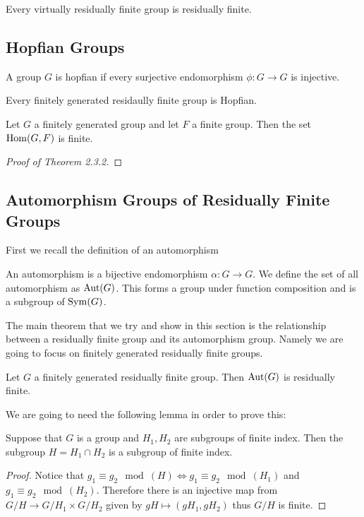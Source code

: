 \begin{propn}
  Every virtually residually finite group is residually finite.
\end{propn}

\subsection{Hopfian Groups}

\begin{defn}
  A group $G$ is hopfian if every surjective endomorphism $\phi: G\to G$  is
  injective.
\end{defn}

\begin{thm}
  Every finitely generated residaully finite group is Hopfian.
\end{thm}
\begin{lemma}
 Let $G$ a finitely generated group and let $F$ a finite group. Then the set
 $\operatorname{Hom}(G, F)$ is finite. 
\end{lemma}

\begin{proof}[Proof of Theorem 2.3.2]
  
\end{proof}

\subsection{Automorphism Groups of Residually Finite Groups}

First we recall the definition of an automorphism
\begin{defn}
  An automorphism is a bijective endomorphism $\alpha: G \to G$. We define the
  set of all automorphism as $\operatorname{Aut}(G)$. This forms a group under function
  composition and is a subgroup of $\operatorname{Sym}(G)$.
\end{defn}

The main theorem that we try and show in this section is the relationship
between a residually finite group and its automorphism group. Namely we are
going to focus on finitely generated residually finite groups.

\begin{thm}
  Let $G$ a finitely generated residually finite group. Then $\operatorname{Aut}(G)$ is
  residually finite.
\end{thm}

We are going to need the following lemma in order to prove this:
\begin{lemma}
  Suppose that $G$ is a group and $H_1, H_2$ are subgroups of finite index.
  Then the subgroup $H = H_1 \cap H_2$ is a subgroup of finite index.
\end{lemma}
\begin{proof}
  Notice that $g_1 \equiv g_2 \mod(H) \iff g_1 \equiv g_2 \mod(H_1)$ and $g_1
  \equiv g_2 \mod(H_2)$. Therefore there is an injective map from $G / H \to
  G / H_1 \times G / H_2$ given by $gH \mapsto (gH_1, gH_2)$ thus $G / H$ is
  finite.
\end{proof}

